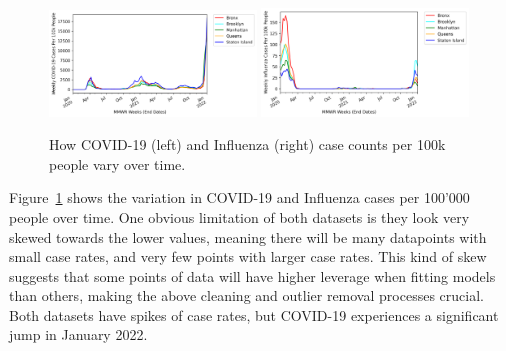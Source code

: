 \documentclass[11pt]{article}
\begin{document}
\begin{figure}[H]

    \centering

    \includegraphics[width=0.49\textwidth]{../plots/time-series-Weekly COVID-19 Cases Per 100k People-vs-MMWR Weeks (End Dates)-by-borough.png}
    \includegraphics[width=0.49\textwidth]{../plots/time-series-Weekly Influenza Cases Per 100k People-vs-MMWR Weeks (End Dates)-by-borough.png}
    \caption{How COVID-19 (left) and Influenza (right) case counts per 100k people vary over time.} %

    \label{fig:ts-measures}
\end{figure}

Figure~\ref{fig:ts-measures} shows the variation in COVID-19 and Influenza cases per 100'000 people over time.
One obvious limitation of both datasets is they look very skewed towards the lower values,
meaning there will be many datapoints with small case rates, and very few points with larger case rates.
This kind of skew suggests that some points of data will have higher leverage when fitting models than others,
making the above cleaning and outlier removal processes crucial.
Both datasets have spikes of case rates, but COVID-19 experiences a significant jump in January 2022.


\end{document}

